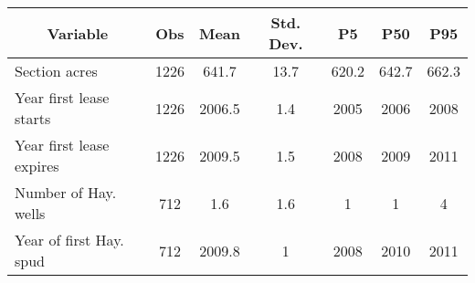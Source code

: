 \begin{tabular}{l c c c  c c c}\hline\hline
\multicolumn{1}{c}{Variable} & Obs & Mean & Std. Dev.
  & P5 & P50 & P95  \\ \hline
Section acres & 1226 & 641.7 & 13.7  & 620.2 & 642.7 & 662.3 \\
Year first lease starts & 1226 & 2006.5 & 1.4  & 2005 & 2006 & 2008 \\
Year first lease expires & 1226 & 2009.5 & 1.5  & 2008 & 2009 & 2011 \\
Number of Hay. wells & 712 & 1.6 & 1.6  & 1 & 1 & 4 \\
Year of first Hay. spud & 712 & 2009.8 & 1  & 2008 & 2010 & 2011 \\
\hline\end{tabular}
